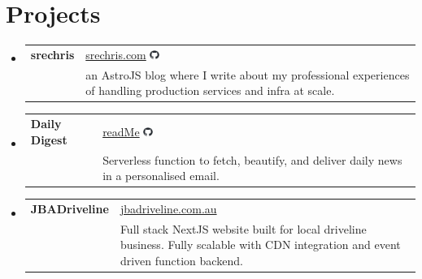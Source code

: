 \section*{Projects}
\begin{itemize}[leftmargin=0.15in, label={}]
  \item{
    \begin{tabular}{p{4.5cm} p{12cm}}
      \textbf{srechris} & \href{https://www.srechris.com}{srechris.com} \hspace{1em} \href{https://github.com/christophersherman/my_blog}{\includegraphics[height=0.8em]{github.png}} \\
      & \small an AstroJS blog where I write about my professional experiences of handling production services and infra at scale.  \\
    \end{tabular}
  }
  \item{
    \begin{tabular}{p{4.5cm} p{12cm}}
      \textbf{Daily Digest} & \href{https://github.com/christophersherman/daily_digest_emailer/blob/main/README.md}{readMe} \hspace{1em} \href{https://github.com/christophersherman/daily_digest_emailer/tree/main}{\includegraphics[height=0.8em]{github.png}} \\
      & \small Serverless function to fetch, beautify, and deliver daily news in a personalised email.  \\
    \end{tabular}
  }
  \item{
    \begin{tabular}{p{4.5cm} p{12cm}}
      \textbf{JBADriveline} & \href{https://www.jbadriveline.com.au/}{jbadriveline.com.au} \hspace{1em} \\
      & \small Full stack NextJS website built for local driveline business. Fully scalable with CDN integration and event driven function backend.  \\
    \end{tabular}
  }
\end{itemize}